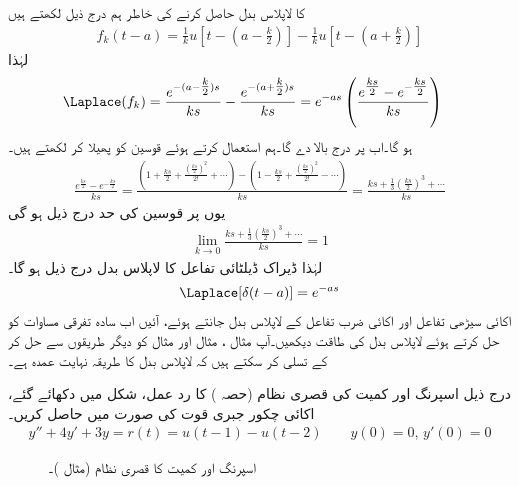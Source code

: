  کا لاپلاس بدل حاصل کرنے کی خاطر ہم درج ذیل لکھتے ہیں
\begin{align*}
f_k(t-a)=\frac{1}{k}u[t-(a-\tfrac{k}{2})]-\frac{1}{k}u[t-(a+\tfrac{k}{2})]
\end{align*}
لہٰذا
\begin{align*}
\Laplace(f_k)&=\frac{e^{-(a-\tfrac{k}{2})s}}{ks}-\frac{e^{-(a+\tfrac{k}{2})s}}{ks}=e^{-as}\left(\frac{e^{\tfrac{ks}{2}}-e^{-\tfrac{ks}{2}}}{ks}\right)
\end{align*}
ہو گا۔اب  پر درج بالا  دے گا۔ہم  استعمال کرتے ہوئے  قوسین کو پھیلا کر لکھتے ہیں۔
\begin{align*}
\frac{e^{\tfrac{ks}{2}}-e^{-\tfrac{ks}{2}}}{ks}=\frac{(1+\tfrac{ks}{2}+\tfrac{(\tfrac{ks}{2})^2}{2!}+\cdots)-(1-\tfrac{ks}{2}+\tfrac{(\tfrac{ks}{2})^2}{2!}-\cdots)}{ks}=\frac{ks+\tfrac{1}{3}(\tfrac{ks}{2})^3+\cdots}{ks}
\end{align*}
یوں  پر قوسین کی حد درج ذیل ہو گی
\begin{align*}
\lim_{k \to 0} \frac{ks+\tfrac{1}{3}(\tfrac{ks}{2})^3+\cdots}{ks}=1
\end{align*}
لہٰذا ڈیراک ڈیلٹائی تفاعل کا لاپلاس بدل درج ذیل ہو گا۔
\begin{align}\label{مساوات_لاپلاس_اکائی_ضرب_کا_بدل}
\Laplace[\delta(t-a)]=e^{-as}
\end{align}
اکائی سیڑھی تفاعل اور اکائی ضرب تفاعل کے لاپلاس بدل جانتے ہوئے، آئیں اب سادہ تفرقی مساوات کو حل کرتے ہوئے لاپلاس بدل کی طاقت دیکھیں۔آپ مثال ، مثال  اور مثال  کو دیگر طریقوں سے حل کر کے تسلی کر سکتے ہیں کہ لاپلاس بدل کا طریقہ نہایت عمدہ ہے۔ 

درج ذیل اسپرنگ اور کمیت کی قصری نظام (حصہ ) کا رد عمل، شکل  میں دکھائے گئے، اکائی چکور جبری قوت کی صورت میں حاصل کریں۔  
\begin{align}
y''+4y'+3y=r(t)=u(t-1)-u(t-2)\quad \quad y(0)=0,\, y'(0)=0
\end{align}
%
\begin{figure}
\centering
{}
\caption{اسپرنگ اور کمیت کا قصری نظام (مثال )۔}
\label{شکل_مثال_لاپلاس_قصری_اسپرنگ_کمیت_الف}
\end{figure}

